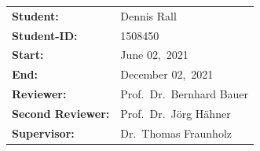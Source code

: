 \newpage
\thispagestyle{empty}

\vspace*{6cm}

\begin{table}[h]
	\centering
	\begin{tabular}{ll}
		\large
		\textbf{Student:} & \large Dennis Rall \\
        \large
		\textbf{Student-ID:} & \large 1508450 \\
		\large
		\textbf{Start:} & \large June 02,\ 2021 \\
		\large
		\textbf{End:} & \large December 02,\ 2021 \\
		\large
		\textbf{Reviewer:} & \large Prof.\ Dr.\ Bernhard Bauer \\
		\large
		\textbf{Second Reviewer:} & \large Prof.\ Dr.\ Jörg Hähner \\
		\large
		\textbf{Supervisor:} & \large Dr.\ Thomas  Fraunholz\\
	\end{tabular}
\end{table}





